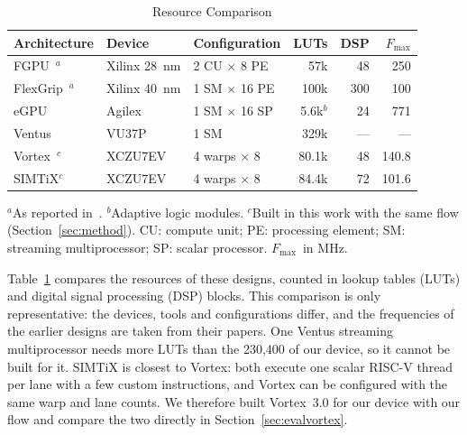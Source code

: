 \documentclass[journal]{IEEEtran}
\newcommand{\Fmax}{$F_{\max}$}
\begin{document}
\begin{table}[t]
\caption{Resource Comparison}
\label{tab:soa}
\centering\footnotesize
\setlength{\tabcolsep}{2.4pt}
\begin{tabular}{lllrrr}
\toprule
Architecture & Device & Configuration & LUTs & DSP & \Fmax\\
\midrule
FGPU~\cite{fgpu}$^a$         & Xilinx 28~nm & 2 CU $\times$ 8 PE & 57k & 48 & 250\\
FlexGrip~\cite{flexgrip}$^a$ & Xilinx 40~nm & 1 SM $\times$ 16 PE & 100k & 300 & 100\\
eGPU~\cite{egpu}             & Agilex & 1 SM $\times$ 16 SP & 5.6k$^b$ & 24 & 771\\
Ventus~\cite{ventus25}       & VU37P & 1 SM & 329k & --- & ---\\
Vortex~\cite{vortex}$^c$     & XCZU7EV & 4 warps $\times$ 8 & 80.1k & 48 & 140.8\\
SIMTiX$^c$                   & XCZU7EV & 4 warps $\times$ 8 & 84.4k & 72 & 101.6\\
\bottomrule
\end{tabular}

\vspace{2pt}
\begin{minipage}{\columnwidth}\footnotesize
$^a$As reported in~\cite{egpu}. $^b$Adaptive logic modules. $^c$Built in this
work with the same flow (Section~\ref{sec:method}). CU: compute unit; PE:
processing element; SM: streaming multiprocessor; SP: scalar processor. \Fmax\
in MHz.
\end{minipage}
\end{table}

Table~\ref{tab:soa} compares the resources of these designs, counted in lookup
tables (LUTs) and digital signal processing (DSP) blocks. This comparison is only
representative: the devices, tools and configurations differ, and the
frequencies of the earlier designs are taken from their papers. One Ventus
streaming multiprocessor needs more LUTs than the 230,400 of our device, so it
cannot be built for it. SIMTiX is closest to Vortex: both execute one scalar
RISC-V thread per lane with a few custom instructions, and Vortex can be
configured with the same warp and lane counts. We therefore built Vortex~3.0 for
our device with our flow and compare the two directly in
Section~\ref{sec:evalvortex}.
\end{document}

